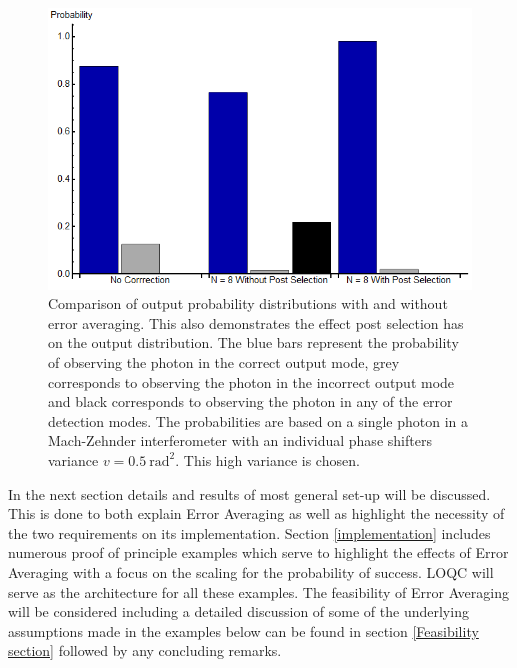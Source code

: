\documentclass[aps,pra,twocolumn,superscriptaddress,numerical]{revtex4-1}
\begin{document}
\begin{figure}
	\begin{centering}
		\includegraphics[width=\columnwidth]{prob_distributions.png}
	\end{centering}
	\caption[Comparison of output probability distributions with and without error averaging.]{Comparison of output probability distributions with and without error 	averaging. This also demonstrates the effect post selection has on the output distribution. The blue bars represent the probability of observing the photon in the correct output mode, grey corresponds to observing the photon in the incorrect output mode and black corresponds to observing the photon in any of the error detection modes. The probabilities are based on a single photon in a Mach-Zehnder interferometer with an individual phase shifters variance $v=0.5\ \textrm{rad}^{2}$. This high variance is chosen.} 
	\label{fig:output_probabilities}
\end{figure}

In the next section details and results of most general set-up will be discussed. This is done to both explain Error Averaging as well as highlight the necessity of the two requirements on its implementation. Section \ref{implementation} includes numerous proof of principle examples which serve to highlight the effects of Error Averaging with a focus on the scaling for the probability of success. LOQC will serve as the architecture for all these examples. The feasibility of Error Averaging will be considered including a detailed discussion of some of the underlying assumptions made in the examples below can be found in section \ref{Feasibility section} followed by any concluding remarks.
\end{document}
